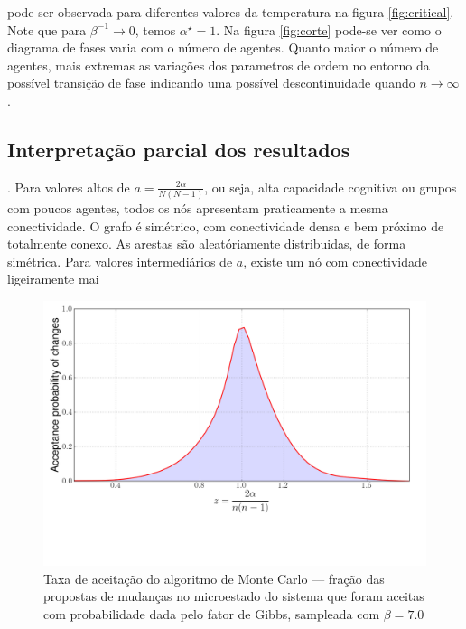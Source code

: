 pode ser observada para diferentes valores da temperatura na figura \ref{fig:critical}. Note que para $\beta^{-1} \to 0$, temos $\alpha^{\star} = 1$. Na figura \ref{fig:corte} pode-se ver como o diagrama de fases varia com o número de agentes. Quanto maior o número de agentes, mais extremas as variações dos parametros de ordem no entorno da possível transição de fase indicando uma possível descontinuidade quando $n\to\infty$. 

\subsection{Interpretação parcial dos resultados}
. Para valores altos de $a = \frac{2\alpha}{N(N-1)}$, ou seja, alta capacidade cognitiva ou grupos com poucos agentes, todos os nós apresentam praticamente a mesma conectividade. O grafo é simétrico, com conectividade densa e bem próximo de totalmente conexo. As arestas são aleatóriamente distribuidas, de forma simétrica. Para valores intermediários de $a$, existe um nó com conectividade ligeiramente mai\begin{figure}
  \includegraphics[width = \textwidth]{figuras/acceptrate.png}
  \caption{Taxa de aceitação do algoritmo de Monte Carlo --- fração das propostas de mudanças no microestado do sistema que foram aceitas com probabilidade dada pelo fator de Gibbs, sampleada com $\beta = 7.0$}
  \label{fig:acceptrate}

\end{figure}
